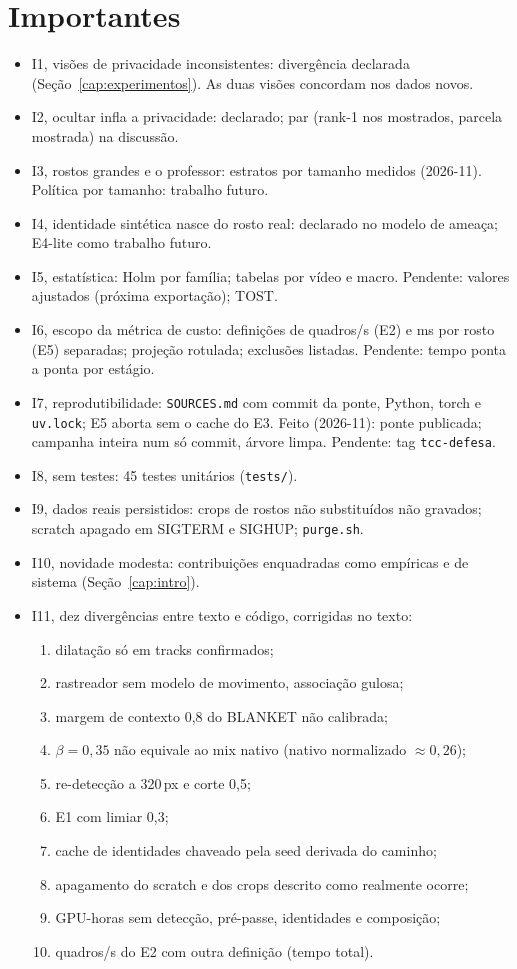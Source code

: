 \section{Importantes}
\begin{itemize}
\item I1, visões de privacidade inconsistentes: divergência declarada (Seção~\ref{cap:experimentos}). As duas visões concordam nos dados novos.
\item I2, ocultar infla a privacidade: declarado; par (rank-1 nos mostrados, parcela mostrada) na discussão.
\item I3, rostos grandes e o professor: estratos por tamanho medidos (2026-11). Política por tamanho: trabalho futuro.
\item I4, identidade sintética nasce do rosto real: declarado no modelo de ameaça; E4-lite como trabalho futuro.
\item I5, estatística: Holm por família; tabelas por vídeo e macro. Pendente: valores ajustados (próxima exportação); TOST.
\item I6, escopo da métrica de custo: definições de quadros/s (E2) e ms por rosto (E5) separadas; projeção rotulada; exclusões listadas. Pendente: tempo ponta a ponta por estágio.
\item I7, reprodutibilidade: \texttt{SOURCES.md} com commit da ponte, Python, torch e \texttt{uv.lock}; E5 aborta sem o cache do E3. Feito (2026-11): ponte publicada; campanha inteira num só commit, árvore limpa. Pendente: tag \texttt{tcc-defesa}.
\item I8, sem testes: 45 testes unitários (\texttt{tests/}).
\item I9, dados reais persistidos: crops de rostos não substituídos não gravados; scratch apagado em SIGTERM e SIGHUP; \texttt{purge.sh}.
\item I10, novidade modesta: contribuições enquadradas como empíricas e de sistema (Seção~\ref{cap:intro}).
\item I11, dez divergências entre texto e código, corrigidas no texto:
  \begin{enumerate}
  \item dilatação só em tracks confirmados;
  \item rastreador sem modelo de movimento, associação gulosa;
  \item margem de contexto 0,8 do BLANKET não calibrada;
  \item $\beta = 0{,}35$ não equivale ao mix nativo (nativo normalizado $\approx 0{,}26$);
  \item re-detecção a 320\,px e corte 0,5;
  \item E1 com limiar 0,3;
  \item cache de identidades chaveado pela seed derivada do caminho;
  \item apagamento do scratch e dos crops descrito como realmente ocorre;
  \item GPU-horas sem detecção, pré-passe, identidades e composição;
  \item quadros/s do E2 com outra definição (tempo total).
  \end{enumerate}
\end{itemize}

